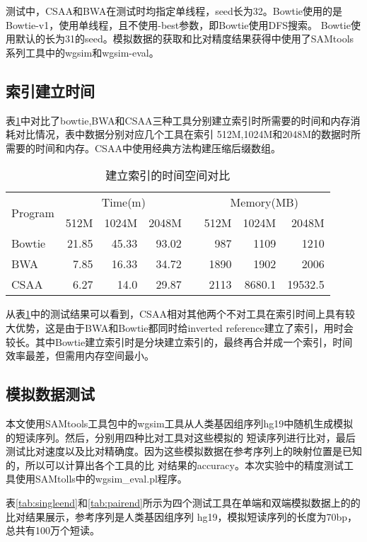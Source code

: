 测试中，CSAA和BWA在测试时均指定单线程，seed长为32。Bowtie使用的是Bowtie-v1，使用单线程，且不使用-best参数，即Bowtie使用DFS搜索。
Bowtie使用默认的长为31的seed。模拟数据的获取和比对精度结果获得中使用了SAMtools系列工具中的wgsim和wgsim-eval。

\subsection{索引建立时间}
表\ref{tab:tab1}中对比了bowtie,BWA和CSAA三种工具分别建立索引时所需要的时间和内存消耗对比情况，表中数据分别对应几个工具在索引
512M,1024M和2048M的数据时所需要的时间和内存。CSAA中使用经典方法构建压缩后缀数组。

\begin{table}[htbp]
    \caption{建立索引的时间空间对比}
    \label{tab:tab1}
    \centering
    \begin{tabular}{lrrrp{2ex}rrr}
        \hline
        \multirow{2}{*}{Program} & \multicolumn{3}{c}{Time(m)}& & \multicolumn{3}{c}{Memory(MB)}\\
        \cline{2-4}
        \cline{6-8}
        & 512M &1024M &2048M& &512M &1024M &2048M\\
        \hline
        Bowtie&21.85 &45.33 &93.02& &987 &1109 &1210 \\
        BWA&7.85 &16.33 &34.72& &1890 &1902 &2006 \\
        CSAA&6.27 &14.0 &29.87& &2113 &8680.1 &19532.5 \\
        \hline
    \end{tabular}
\end{table}

从表\ref{tab:tab1}中的测试结果可以看到，CSAA相对其他两个不对工具在索引时间上具有较大优势，这是由于BWA和Bowtie都同时给inverted
reference建立了索引，用时会较长。其中Bowtie建立索引时是分块建立索引的，最终再合并成一个索引，时间效率最差，但需用内存空间最小。

\subsection{模拟数据测试}
本文使用SAMtools工具包中的wgsim工具从人类基因组序列hg19中随机生成模拟的短读序列。然后，分别用四种比对工具对这些模拟的
短读序列进行比对，最后测试比对速度以及比对精确度。因为这些模拟数据在参考序列上的映射位置是已知的，所以可以计算出各个工具的比
对结果的accuracy。本次实验中的精度测试工具使用SAMtolls中的wgsim\_eval.pl程序。

表\ref{tab:singleend}和\ref{tab:pairend}所示为四个测试工具在单端和双端模拟数据上的的比对结果展示，参考序列是人类基因组序列
hg19，模拟短读序列的长度为70bp，总共有100万个短读。

